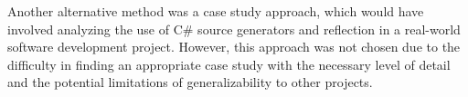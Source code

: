 Another alternative method was a case study approach, which would have involved analyzing the use of C\# source generators and reflection in a real-world software development project. However, this approach was not chosen due to the difficulty in finding an appropriate case study with the necessary level of detail and the potential limitations of generalizability to other projects.